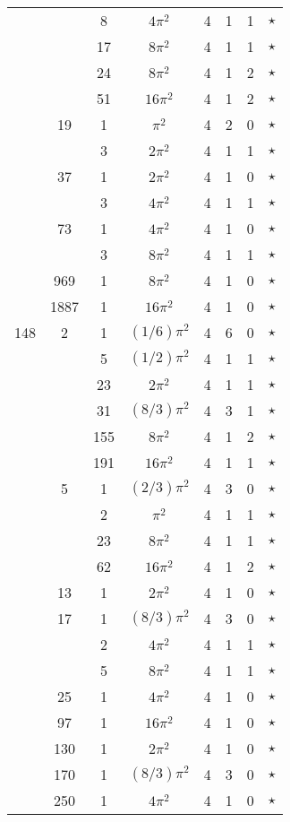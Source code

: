 \documentclass[12pt]{amsart}
\begin{document}
\begin{tabular}{ccc|ccccc}
 &  & 8 & $4\pi^2$ & 4 & 1 & 1 & $\star$ \\
 &  & 17 & $8\pi^2$ & 4 & 1 & 1 & $\star$ \\
 &  & 24 & $8\pi^2$ & 4 & 1 & 2 & $\star$ \\
 &  & 51 & $16\pi^2$ & 4 & 1 & 2 & $\star$ \\
 & 19 & 1 & $\pi^2$ & 4 & 2 & 0 & $\star$ \\
 &  & 3 & $2\pi^2$ & 4 & 1 & 1 & $\star$ \\
 & 37 & 1 & $2\pi^2$ & 4 & 1 & 0 & $\star$ \\
 &  & 3 & $4\pi^2$ & 4 & 1 & 1 & $\star$ \\
 & 73 & 1 & $4\pi^2$ & 4 & 1 & 0 & $\star$ \\
 &  & 3 & $8\pi^2$ & 4 & 1 & 1 & $\star$ \\
 & 969 & 1 & $8\pi^2$ & 4 & 1 & 0 & $\star$ \\
 & 1887 & 1 & $16\pi^2$ & 4 & 1 & 0 & $\star$ \\
148 & 2 & 1 & $(1/6)\pi^2$ & 4 & 6 & 0 & $\star$ \\
 &  & 5 & $(1/2)\pi^2$ & 4 & 1 & 1 & $\star$ \\
 &  & 23 & $2\pi^2$ & 4 & 1 & 1 & $\star$ \\
 &  & 31 & $(8/3)\pi^2$ & 4 & 3 & 1 & $\star$ \\
 &  & 155 & $8\pi^2$ & 4 & 1 & 2 & $\star$ \\
 &  & 191 & $16\pi^2$ & 4 & 1 & 1 & $\star$ \\
 & 5 & 1 & $(2/3)\pi^2$ & 4 & 3 & 0 & $\star$ \\
 &  & 2 & $\pi^2$ & 4 & 1 & 1 & $\star$ \\
 &  & 23 & $8\pi^2$ & 4 & 1 & 1 & $\star$ \\
 &  & 62 & $16\pi^2$ & 4 & 1 & 2 & $\star$ \\
 & 13 & 1 & $2\pi^2$ & 4 & 1 & 0 & $\star$ \\
 & 17 & 1 & $(8/3)\pi^2$ & 4 & 3 & 0 & $\star$ \\
 &  & 2 & $4\pi^2$ & 4 & 1 & 1 & $\star$ \\
 &  & 5 & $8\pi^2$ & 4 & 1 & 1 & $\star$ \\
 & 25 & 1 & $4\pi^2$ & 4 & 1 & 0 & $\star$ \\
 & 97 & 1 & $16\pi^2$ & 4 & 1 & 0 & $\star$ \\
 & 130 & 1 & $2\pi^2$ & 4 & 1 & 0 & $\star$ \\
 & 170 & 1 & $(8/3)\pi^2$ & 4 & 3 & 0 & $\star$ \\
 & 250 & 1 & $4\pi^2$ & 4 & 1 & 0 & $\star$ \\

\end{tabular}
\end{document}
